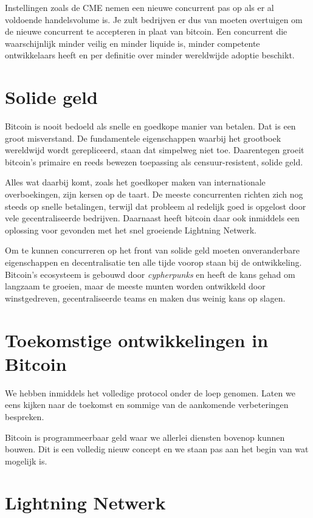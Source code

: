 Instellingen zoals de CME nemen een nieuwe concurrent pas op als er al voldoende handelsvolume is. Je zult bedrijven er dus van moeten overtuigen om de nieuwe concurrent te accepteren in plaat van bitcoin. Een concurrent die waarschijnlijk minder veilig en minder liquide is, minder competente ontwikkelaars heeft en per definitie over minder wereldwijde adoptie beschikt. 

\section{Solide geld}

Bitcoin is nooit bedoeld als snelle en goedkope manier van betalen. Dat is een groot misverstand. De fundamentele eigenschappen waarbij het grootboek wereldwijd wordt gerepliceerd, staan dat simpelweg niet toe. Daarentegen groeit bitcoin's primaire en reeds bewezen toepassing als censuur-resistent, solide geld. 

Alles wat daarbij komt, zoals het goedkoper maken van internationale overboekingen, zijn kersen op de taart. De meeste concurrenten richten zich nog steeds op snelle betalingen, terwijl dat probleem al redelijk goed is opgelost door vele gecentraliseerde bedrijven. Daarnaast heeft bitcoin daar ook inmiddels een oplossing voor gevonden met het snel groeiende Lightning Netwerk. 

Om te kunnen concurreren op het front van solide geld moeten onveranderbare eigenschappen en decentralisatie ten alle tijde voorop staan bij de ontwikkeling. Bitcoin's ecosysteem is gebouwd door \textit{cypherpunks} en heeft de kans gehad om langzaam te groeien, maar de meeste munten worden ontwikkeld door winstgedreven, gecentraliseerde teams en maken dus weinig kans op slagen.   

\newpage
\section{Toekomstige ontwikkelingen in Bitcoin}

We hebben inmiddels het volledige protocol onder de loep genomen. Laten we eens kijken naar de toekomst en sommige van de aankomende verbeteringen bespreken.

Bitcoin is programmeerbaar geld waar we allerlei diensten bovenop kunnen bouwen. Dit is een volledig nieuw concept en we staan pas aan het begin van wat mogelijk is.

\section{Lightning Netwerk}

